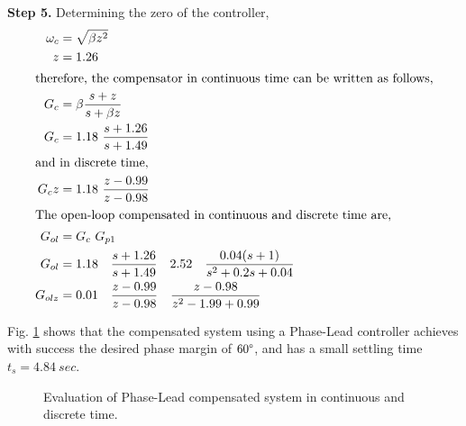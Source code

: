 \documentclass[11pt, a4paper]{article}
\begin{document}
\textbf{Step 5.} Determining the zero of the controller,
\begin{align}
\omega_c &= \sqrt{\beta z^2}\\
z &= 1.26 \nonumber\\
\intertext{therefore, the compensator in continuous time can be written as follows,}
G_c &= \beta\dfrac{s+z}{s+\beta z} \\
G_c &= 1.18~\dfrac{s+1.26}{s+1.49} \nonumber\\
\intertext{and in discrete time,}
G_cz &= 1.18~\dfrac{z-0.99}{z-0.98} \nonumber\\
\intertext{The open-loop compensated in continuous and discrete time are,}
G_{ol} &= G_c~ G_{p1}\\
G_{ol} &= 1.18\quad\dfrac{s+1.26}{s+1.49} \quad 2.52\quad\dfrac{0.04(s+1)}{s^2+0.2s+0.04} \\
G_{olz} &= 0.01\quad \dfrac{z-0.99}{z-0.98}\quad\dfrac{z-0.98}{z^2-1.99+0.99}
\end{align}
 
Fig. \ref{fig:Q1_lead} shows that the compensated system using a Phase-Lead controller achieves with success the desired phase margin of $60\degree$, and has a small settling time $t_s=4.84~sec$.

\begin{figure}[H]
	\centering
	\caption{Evaluation of Phase-Lead compensated system in continuous and discrete time.}
	\label{fig:Q1_lead}
\end{figure}
\end{document}
